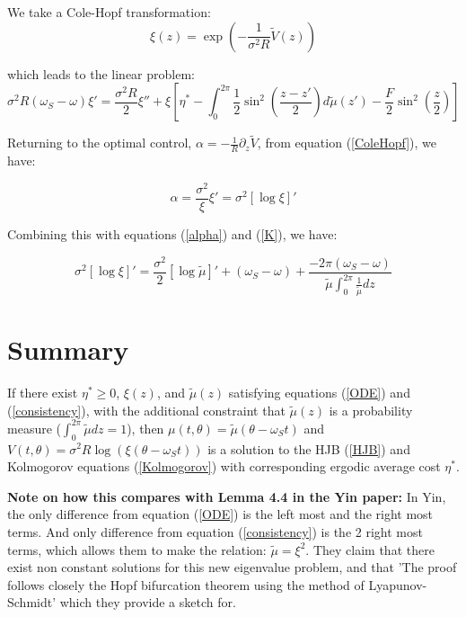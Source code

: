 \documentclass[]{article}
\begin{document}
We take a Cole-Hopf transformation:
\begin{equation}
\xi(z)=\exp\left(-\frac{1}{\sigma^2R}\tilde{V}(z)\right)
\label{ColeHopf}
\end{equation}

which leads to the linear problem:
\begin{equation}
\sigma^2R(\omega_S-\omega) \xi'=\frac{\sigma^2R}{2} \xi'' + \xi \left[\eta^* -\int_0^{2\pi}\frac{1}{2} \sin^2\left(\frac{z-z'}{2}\right)d \tilde{\mu}(z')-\frac{F}{2} \sin^2\left(\frac{z}{2}\right)\right]
\label{ODE}
\end{equation}

Returning to the optimal control, $\alpha=-\frac{1}{R}\partial_z \tilde{V}$, from equation (\ref{ColeHopf}), we have:

\begin{equation}
\alpha=\frac{\sigma^2}{\xi}\xi'=\sigma^2 \left[\log\xi \right]'
\end{equation}

Combining this with equations (\ref{alpha}) and (\ref{K}), we have:

\begin{equation}
\sigma^2 \left[\log\xi \right]'=\frac{\sigma^2}{2} \left[\log\tilde{\mu}\right]'+(\omega_S-\omega)+\frac{-2\pi(\omega_S-\omega) }{\tilde{\mu}\int_0^{2\pi} \frac{1}{\tilde{\mu}}dz}
\label{consistency}
\end{equation}

\section{Summary}
If there exist $\eta^* \geq0$, $\xi(z)$, and $\tilde{\mu}(z)$ satisfying equations (\ref{ODE}) and (\ref{consistency}), with the additional constraint that $\tilde{\mu}(z)$ is a probability measure ($\int_0^{2\pi}\tilde{\mu}dz=1$), then $\mu(t,\theta)=\tilde{\mu}(\theta-\omega_S t)$ and $V(t,\theta)=\sigma^2R \log(\xi(\theta-\omega_S t))$ is a solution to the HJB (\ref{HJB}) and Kolmogorov equations (\ref{Kolmogorov}) with corresponding ergodic average cost $\eta^*$.

\textbf{Note on how this compares with Lemma 4.4 in the Yin paper:}
In Yin, the only difference from equation (\ref{ODE}) is the left most and the right most terms. And only difference from equation (\ref{consistency}) is the 2 right most terms, which allows them to make the relation: $\tilde{\mu}=\xi^2$. They claim that there exist non constant solutions for this new eigenvalue problem, and that 'The proof follows closely the Hopf bifurcation theorem using the method of Lyapunov-Schmidt' which they provide a sketch for.
\end{document}
